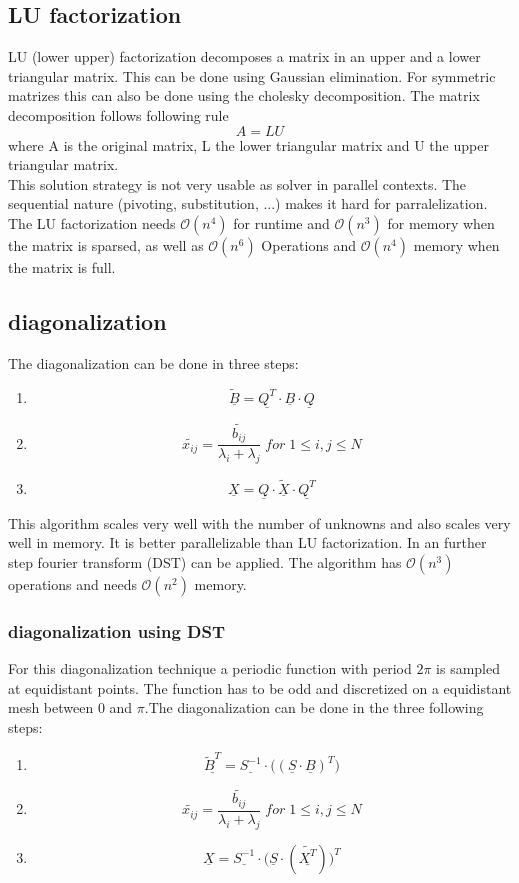 \documentclass{article}
\begin{document}
\subsection{LU factorization}
LU (lower upper) factorization decomposes a matrix in an upper and a lower triangular matrix. This can be done using Gaussian elimination. For symmetric matrizes this can also be done using the cholesky decomposition. The matrix decomposition follows following rule
\begin{equation}
A=LU
\end{equation}
where A is the original matrix, L the lower triangular matrix and U the upper triangular matrix.\\
This solution strategy is not very usable as solver in parallel contexts. The sequential nature (pivoting, substitution, ...) makes it hard for parralelization. The LU factorization needs $\mathcal{O}(n^4)$ for runtime and $\mathcal{O}(n^3)$ for memory when the matrix is sparsed, as well as $\mathcal{O}(n^6)$ Operations and $\mathcal{O}(n^4)$ memory when the matrix is full.
\subsection{diagonalization}
The diagonalization can be done in three steps:
\begin{enumerate}
\item $$\underline{\tilde{B}}=\underline{Q^T}\cdot\underline{B}\cdot\underline{Q}$$
\item $$\tilde{x_{ij}}=\frac{\tilde{b_{ij}}}{\lambda_i+\lambda_j}\;for\;1\leq i,j \leq N$$
\item $$\underline{X}=\underline{Q}\cdot\underline{\tilde{X}}\cdot\underline{Q^T}$$
\end{enumerate}
This algorithm scales very well with the number of unknowns and also scales very well in memory. It is better parallelizable than LU factorization. In an further step fourier transform (DST) can be applied. The algorithm has $\mathcal{O}(n^3)$ operations and needs $\mathcal{O}(n^2)$ memory.
\subsubsection{diagonalization using DST}
For this diagonalization technique a periodic function with period $2\pi$ is sampled at equidistant points. The function has to be odd and discretized on a equidistant mesh between 0 and $\pi$.The diagonalization can be done in the three following steps:
\begin{enumerate}
\item $$ \underline{\tilde{B}^T}=\underline{S^{-1}}\cdot\big((\underline{S}\cdot\underline{B})^T\big)$$
\item $$ \tilde{x_{ij}}=\frac{\tilde{b_{ij}}}{\lambda_i+\lambda_j}\;for\;1\leq i,j\leq N$$
\item $$ \underline{X}=\underline{S^{-1}}\cdot\big(\underline{S}\cdot(\underline{\tilde{X^T}})\big)^T$$
\end{enumerate}
\end{document}

